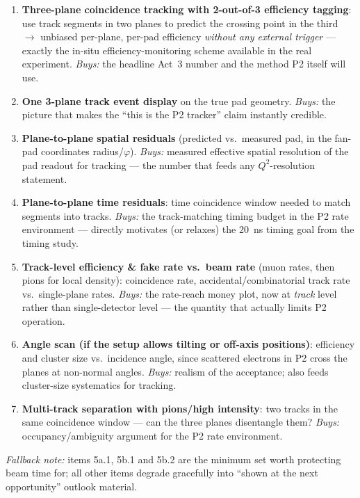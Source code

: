 \documentclass[11pt,a4paper]{article}
\begin{document}
\begin{enumerate}[itemsep=2pt]
  \item \textbf{Three-plane coincidence tracking with 2-out-of-3 efficiency
    tagging}: use track segments in two planes to predict the crossing point
    in the third $\rightarrow$ unbiased per-plane, per-pad efficiency
    \emph{without any external trigger} --- exactly the in-situ
    efficiency-monitoring scheme available in the real experiment.
    \emph{Buys:} the headline Act~3 number and the method P2 itself will use.
  \item \textbf{One 3-plane track event display} on the true pad geometry.
    \emph{Buys:} the picture that makes the ``this is the P2 tracker'' claim
    instantly credible.
  \item \textbf{Plane-to-plane spatial residuals} (predicted vs.\ measured
    pad, in the fan-pad coordinates radius/$\varphi$). \emph{Buys:} measured
    effective spatial resolution of the pad readout for tracking --- the
    number that feeds any $Q^2$-resolution statement.
  \item \textbf{Plane-to-plane time residuals}: time coincidence window needed
    to match segments into tracks. \emph{Buys:} the track-matching timing
    budget in the P2 rate environment --- directly motivates (or relaxes) the
    20~ns timing goal from the timing study.
  \item \textbf{Track-level efficiency \& fake rate vs.\ beam rate} (muon
    rates, then pions for local density): coincidence rate,
    accidental/combinatorial track rate vs.\ single-plane rates. \emph{Buys:}
    the rate-reach money plot, now at \emph{track} level rather than
    single-detector level --- the quantity that actually limits P2 operation.
  \item \textbf{Angle scan (if the setup allows tilting or off-axis
    positions)}: efficiency and cluster size vs.\ incidence angle, since
    scattered electrons in P2 cross the planes at non-normal angles.
    \emph{Buys:} realism of the acceptance; also feeds cluster-size
    systematics for tracking.
  \item \textbf{Multi-track separation with pions/high intensity}: two tracks
    in the same coincidence window --- can the three planes disentangle them?
    \emph{Buys:} occupancy/ambiguity argument for the P2 rate environment.
\end{enumerate}

\emph{Fallback note:} items 5a.1, 5b.1 and 5b.2 are the minimum set worth
protecting beam time for; all other items degrade gracefully into ``shown at
the next opportunity'' outlook material.
\end{document}

